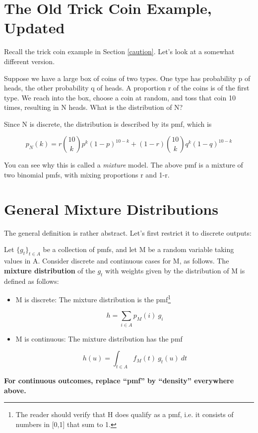 \documentclass[11pt]{article}
\begin{document}
\section{The Old Trick Coin Example, Updated}
\label{oldtrick}

Recall the trick coin example in Section \ref{caution}.  Let's look at a
somewhat different version.

Suppose we have a large box of coins of two types. One type has
probability p of heads, the other probability q of heads. A proportion r
of the coins is of the first type. We reach into the box, choose a coin
at random, and toss that coin 10 times, resulting in N heads. What is
the distribution of N?

Since N is discrete, the distribution is described by its pmf, which is

\begin{equation}
\label{mixbinom}
p_N(k) = r \binom{10}{k} p^k (1-p)^{10-k} +
(1-r) \binom{10}{k} q^k (1-q)^{10-k}
\end{equation}

You can see why this is called a {\it mixture} model. The above pmf is a
mixture of two binomial pmfs, with mixing proportions r and 1-r.

\section{General Mixture Distributions}
\label{genmix}

The general definition is rather abstract.  Let's first restrict it to
discrete outputs:

\begin{definition} Let $\{g_t\}_{t \in A}$ be a collection of pmfs, and
let M be a random variable taking values in A.  Consider discrete and
continuous cases for M, as follows.  The {\bf mixture distribution} of
the $g_t$ with weights given by the distribution of M is defined as
follows:

\begin{itemize}

\item M is discrete:  The mixture distribution is the pmf\footnote{The
reader should verify that H does qualify as a pmf, i.e. it consists of
numbers in [0,1] that sum to 1.}

\begin{equation}
\label{hsum}
h = \sum_{i \in A} p_M(i) ~ g_i
\end{equation}

\item M is continuous:  The mixture distribution has the pmf 

\begin{equation}
\label{continmix}
h(u) = \int_{t \in A} f_M(t)~  g_t(u) ~ dt
\end{equation}

\end{itemize}

{\bf For continuous outcomes, replace ``pmf'' by ``density'' everywhere
above.}

\end{definition}
\end{document}
